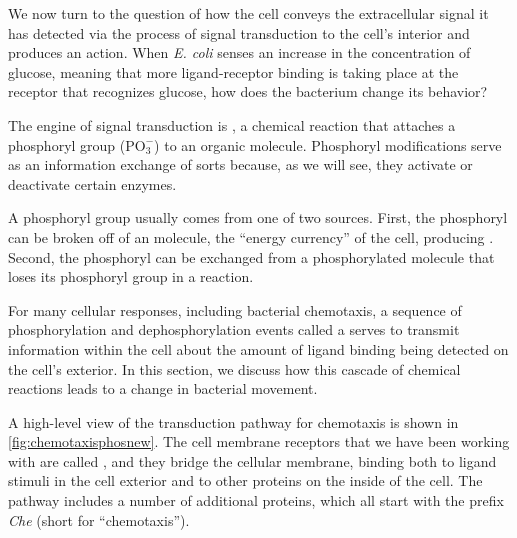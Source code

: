 We now turn to the question of how the cell conveys the extracellular signal it has detected via the process of signal transduction to the cell's interior and produces an action. When \textit{E. coli} senses an increase in the concentration of glucose, meaning that more ligand-receptor binding is taking place at the receptor that recognizes glucose, how does the bacterium change its behavior?

The engine of signal transduction is , a chemical reaction that attaches a phosphoryl group ($\text{PO}_3^{-}$) to an organic molecule.  Phosphoryl modifications serve as an information exchange of sorts because, as we will see, they activate or deactivate certain enzymes.

A phosphoryl group usually comes from one of two sources. First, the phosphoryl can be broken off of an  molecule, the ``energy currency'' of the cell, producing . Second, the phosphoryl can be exchanged from a phosphorylated molecule that loses its phosphoryl group in a  reaction.

For many cellular responses, including bacterial chemotaxis, a sequence of phosphorylation and dephosphorylation events called a  serves to transmit information within the cell about the amount of ligand binding being detected on the cell's exterior. In this section, we discuss how this cascade of chemical reactions leads to a change in bacterial movement.

A high-level view of the transduction pathway for chemotaxis is shown in \autoref{fig:chemotaxisphosnew}. The cell membrane receptors that we have been working with are called , and they bridge the cellular membrane, binding both to ligand stimuli in the cell exterior and to other proteins on the inside of the cell. The pathway includes a number of additional proteins, which all start with the prefix \textit{Che} (short for ``chemotaxis'').

